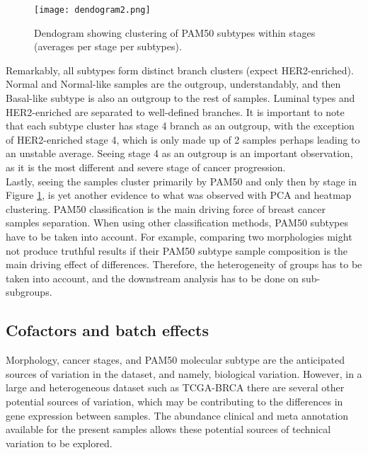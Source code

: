             \begin{figure}[!h]
            \centering
            \texttt{[image: dendogram2.png]}
            \caption{Dendogram showing clustering of PAM50 subtypes within stages (averages per stage per subtypes).}
            \label{fig:dendogram}
            \end{figure}
    
    Remarkably, all subtypes form distinct branch clusters (expect HER2-enriched). Normal and Normal-like samples are the outgroup, understandably, and then Basal-like subtype is also an outgroup to the rest of samples. Luminal types and HER2-enriched are separated to well-defined branches. It is important to note that each subtype cluster has stage 4 branch as an outgroup, with the exception of HER2-enriched stage 4, which is only made up of 2 samples perhaps leading to an unstable average. Seeing stage 4 as an outgroup is an important observation, as it is the most different and severe stage of cancer progression. \\
    
    Lastly, seeing the samples cluster primarily by PAM50 and only then by stage in Figure \ref{fig:dendogram}, is yet another evidence to what was observed with PCA and heatmap clustering. PAM50 classification is the main driving force of breast cancer samples separation. When using other classification methods, PAM50 subtypes have to be taken into account. For example, comparing two morphologies might not produce truthful results if their PAM50 subtype sample composition is the main driving effect of differences. Therefore, the heterogeneity of groups has to be taken into account, and the downstream analysis has to be done on sub-subgroups.  
    

    
    \newpage
    \subsection{Cofactors and batch effects}
    
    Morphology, cancer stages, and PAM50 molecular subtype are the anticipated sources of variation in the dataset, and namely, biological variation. However, in a large and heterogeneous dataset such as TCGA-BRCA there are several other potential sources of variation, which may be contributing to the differences in gene expression between samples. The abundance clinical and meta annotation available for the present samples allows these potential sources of technical variation to be explored.
    
